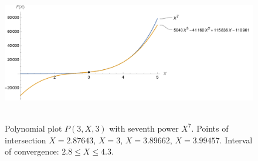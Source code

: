﻿\begin{figure}[H]
    \centering
    \includegraphics[width=1\textwidth]{sections/images/05_plots_polynomial_p3_n3_with_seventh}
    ~\caption{Polynomial plot $P(3, X, 3)$ with seventh power $X^7$.
    Points of intersection $X=2.87643$, $X=3$, $X=3.89662$, $X=3.99457$.
    Interval of convergence: $2.8 \leq X \leq 4.3$.
    }\label{fig:figure11}
\end{figure}
